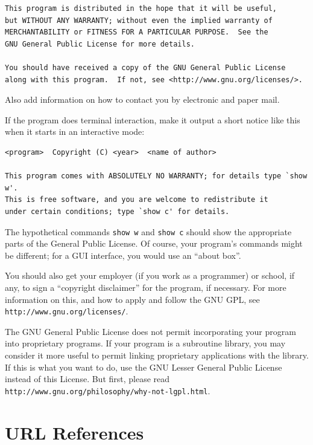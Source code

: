 \documentclass[12pt,a4paper]{book}
\begin{document}
\begin{enumerate}
{\begin{verbatim}
This program is distributed in the hope that it will be useful,
but WITHOUT ANY WARRANTY; without even the implied warranty of
MERCHANTABILITY or FITNESS FOR A PARTICULAR PURPOSE.  See the
GNU General Public License for more details.

You should have received a copy of the GNU General Public License
along with this program.  If not, see <http://www.gnu.org/licenses/>.
\end{verbatim}
}

Also add information on how to contact you by electronic and paper mail.

If the program does terminal interaction, make it output a short
notice like this when it starts in an interactive mode:

{\footnotesize
\begin{verbatim}
<program>  Copyright (C) <year>  <name of author>

This program comes with ABSOLUTELY NO WARRANTY; for details type `show w'.
This is free software, and you are welcome to redistribute it
under certain conditions; type `show c' for details.
\end{verbatim}
}

The hypothetical commands {\tt show w} and {\tt show c} should show
the appropriate
parts of the General Public License.  Of course, your program's commands
might be different; for a GUI interface, you would use an ``about box''.

You should also get your employer (if you work as a programmer) or
school, if any, to sign a ``copyright disclaimer'' for the program, if
necessary.  For more information on this, and how to apply and follow
the GNU GPL, see \texttt{http://www.gnu.org/licenses/}.

The GNU General Public License does not permit incorporating your
program into proprietary programs.  If your program is a subroutine
library, you may consider it more useful to permit linking proprietary
applications with the library.  If this is what you want to do, use
the GNU Lesser General Public License instead of this License.  But
first, please read \texttt{http://www.gnu.org/philosophy/why-not-lgpl.html}.

\end{enumerate}

\chapter{URL References}
\label{URL REF}
\end{document}

